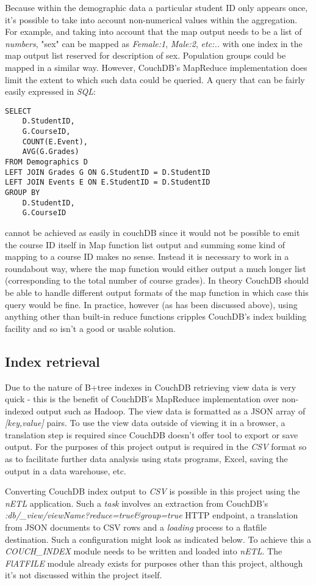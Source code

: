 Because within the demographic data a particular student ID only appears once, it's possible to take into account non-numerical values within the aggregation. For example, and taking into account that the map output needs to be a list of \textit{numbers}, "sex" can be mapped as \textit{Female:1}, \textit{Male:2}, \textit{etc:..} with one index in the map output list reserved for description of sex. Population groups could be mapped in a similar way. However, CouchDB's MapReduce implementation does limit the extent to which such data could be queried. A query that can be fairly easily expressed in \textit{SQL}:

\begin{verbatim}
SELECT
    D.StudentID,
    G.CourseID,
    COUNT(E.Event),
    AVG(G.Grades)
FROM Demographics D
LEFT JOIN Grades G ON G.StudentID = D.StudentID
LEFT JOIN Events E ON E.StudentID = D.StudentID
GROUP BY
    D.StudentID,
    G.CourseID
\end{verbatim}

cannot be achieved as easily in couchDB since it would not be possible to emit the course ID itself in Map function list output and summing some kind of mapping to a course ID makes no sense. Instead it is necessary to work in a roundabout way, where the map function would either output a much longer list (corresponding to the total number of course grades). In theory CouchDB should be able to handle different output formats of the map function in which case this query would be fine. In practice, however (as has been discussed above), using anything other than built-in reduce functions cripples CouchDB's index building facility and so isn't a good or usable solution.

\subsection{Index retrieval}
Due to the nature of B+tree indexes in CouchDB retrieving view data is very quick - this is the benefit of CouchDB's MapReduce implementation over non-indexed output such as Hadoop. The view data is formatted as a JSON array of \textit{[key,value]} pairs. To use the view data outside of viewing it in a browser, a translation step is required since CouchDB doesn't offer tool to export or save output. For the purposes of this project output is required in the \textit{CSV} format so as to facilitate further data analysis using stats programs, Excel, saving the output in a data warehouse, etc.

Converting CouchDB index output to \textit{CSV} is possible in this project using the \textit{nETL} application. Such a \textit{task} involves an extraction from CouchDB's \textit{:db/\_view/viewName?reduce=true\&group=true} HTTP endpoint, a translation from JSON documents to CSV rows and a \textit{loading} process to a flatfile destination. Such a configuration might look as indicated below. To achieve this a \textit{COUCH\_INDEX} module needs to be written and loaded into \textit{nETL}. The \textit{FlATFILE} module already exists for purposes other than this project, although it's not discussed within the project itself.

